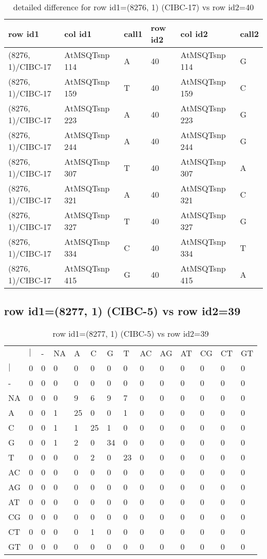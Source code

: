 \begin{center}
\begin{longtable}{|l|l|l|l|l|l|}
\caption{detailed difference for row id1=(8276, 1) (CIBC-17) vs row id2=40} \label{table_dm241}\\
\hline
row id1&col id1&call1&row id2&col id2&call2\\
\hline
(8276, 1)/CIBC-17&AtMSQTsnp 114&A&40&AtMSQTsnp 114&G\\
(8276, 1)/CIBC-17&AtMSQTsnp 159&T&40&AtMSQTsnp 159&C\\
(8276, 1)/CIBC-17&AtMSQTsnp 223&A&40&AtMSQTsnp 223&G\\
(8276, 1)/CIBC-17&AtMSQTsnp 244&A&40&AtMSQTsnp 244&G\\
(8276, 1)/CIBC-17&AtMSQTsnp 307&T&40&AtMSQTsnp 307&A\\
(8276, 1)/CIBC-17&AtMSQTsnp 321&A&40&AtMSQTsnp 321&C\\
(8276, 1)/CIBC-17&AtMSQTsnp 327&T&40&AtMSQTsnp 327&G\\
(8276, 1)/CIBC-17&AtMSQTsnp 334&C&40&AtMSQTsnp 334&T\\
(8276, 1)/CIBC-17&AtMSQTsnp 415&G&40&AtMSQTsnp 415&A\\
\hline
\end{longtable}
\end{center}

\subsection{row id1=(8277, 1) (CIBC-5) vs row id2=39}
\begin{center}
\begin{longtable}{|l|l|l|l|l|l|l|l|l|l|l|l|l|l|}
\caption{row id1=(8277, 1) (CIBC-5) vs row id2=39} \label{table_dm242}\\
\hline
\\
\hline
&$|$&-&NA&A&C&G&T&AC&AG&AT&CG&CT&GT\\
$|$&0&0&0&0&0&0&0&0&0&0&0&0&0\\
-&0&0&0&0&0&0&0&0&0&0&0&0&0\\
NA&0&0&0&9&6&9&7&0&0&0&0&0&0\\
A&0&0&1&25&0&0&1&0&0&0&0&0&0\\
C&0&0&1&1&25&1&0&0&0&0&0&0&0\\
G&0&0&1&2&0&34&0&0&0&0&0&0&0\\
T&0&0&0&0&2&0&23&0&0&0&0&0&0\\
AC&0&0&0&0&0&0&0&0&0&0&0&0&0\\
AG&0&0&0&0&0&0&0&0&0&0&0&0&0\\
AT&0&0&0&0&0&0&0&0&0&0&0&0&0\\
CG&0&0&0&0&0&0&0&0&0&0&0&0&0\\
CT&0&0&0&0&1&0&0&0&0&0&0&0&0\\
GT&0&0&0&0&0&0&0&0&0&0&0&0&0\\
\hline
\end{longtable}
\end{center}

